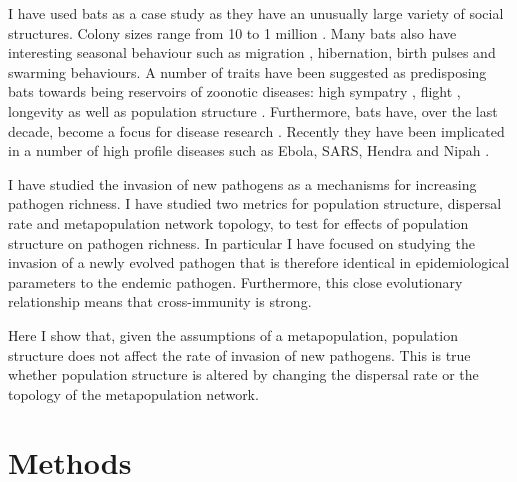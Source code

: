 I have used bats as a case study as they have an unusually large variety of social structures.
Colony sizes range from 10 to 1 million \cite{jones2009pantheria}.
Many bats also have interesting seasonal behaviour such as migration \cite{richter2008first, fleming2003ecology}, hibernation, birth pulses and swarming behaviours.
A number of traits have been suggested as predisposing bats towards being reservoirs of zoonotic diseases: high sympatry \cite{luis2013comparison}, flight \cite{wang2011mass}, longevity \cite{wang2011mass} as well as population structure \cite{maganga2014bat, turmelle2009correlates, gay2014parasite}.
Furthermore, bats have, over the last decade, become a focus for disease research  \cite{calisher2006bats, hughes2007emerging}.
Recently they have been implicated in a number of high profile diseases such as Ebola, SARS, Hendra and Nipah  \cite{calisher2006bats, li2005bats}.





I have studied the invasion of new pathogens as a mechanisms for increasing pathogen richness.
I have studied two metrics for population structure, dispersal rate and metapopulation network topology, to test for effects of population structure on pathogen richness.
In particular I have focused on studying the invasion of a newly evolved pathogen that is therefore identical in epidemiological parameters to the endemic pathogen.
Furthermore, this close evolutionary relationship means that cross-immunity is strong.


Here I show that, given the assumptions of a metapopulation, population structure does not affect the rate of invasion of new pathogens.
This is true whether population structure is altered by changing the dispersal rate or the topology of the metapopulation network.






\section{Methods}

